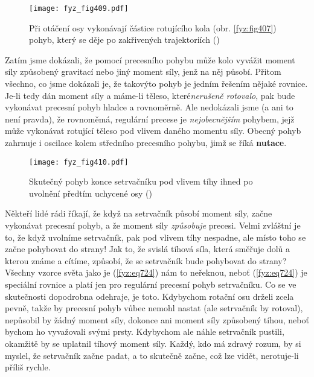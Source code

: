     \begin{figure}[ht!] %
      \centering
      \texttt{[image: fyz\_fig409.pdf]}
      \caption{Při otáčení osy vykonávají částice rotujícího kola (obr. \ref{fyz:fig407}) pohyb, 
               který se děje po zakřivených trajektoriích 
               (\cite[s.~280]{Feynman01})}
      \label{fyz:fig409}
    \end{figure}

    Zatím jsme dokázali, že pomocí precesního pohybu může kolo vyvážit moment síly způsobený
    gravitací nebo jiný moment síly, jenž na něj působí. Přitom všechno, co jsme dokázali je, že
    takovýto pohyb je jedním řešením nějaké rovnice. Je-li tedy dán moment síly a máme-li těleso,
    které\emph{nerušeně rotovalo}, pak bude vykonávat precesní pohyb hladce a rovnoměrně. Ale
    nedokázali jsme (a ani to není pravda), že rovnoměmá, regulární precese je \emph{nejobecnějším}
    pohybem, jejž může vykonávat rotující těleso pod vlivem daného momentu síly. Obecný pohyb
    zahrnuje i oscilace kolem středního precesního pohybu, jimž se říká \textbf{nutace}.

    \begin{figure}[ht!] %
      \centering
      \texttt{[image: fyz\_fig410.pdf]}
      \caption{Skutečný pohyb konce setrvačníku pod vlivem tíhy ihned po uvolnění předtím uchycené
               osy (\cite[s.~281]{Feynman01})}
      \label{fyz:fig410}
    \end{figure}

    Někteří lidé rádi říkají, že když na setrvačník působí moment síly, začne vykonávat precesní
    pohyb, a že moment síly \emph{způsobuje} precesi. Velmi zvláštní je to, že když uvolníme
    setrvačník, pak pod vlivem tíhy nespadne, ale místo toho se začne pohybovat do strany! Jak to,
    že svislá tíhová síla, která směřuje dolů a kterou známe a cítíme, způsobí, že se setrvačník
    bude pohybovat do strany? Všechny vzorce světa jako je (\ref{fyz:eq724}) nám to neřeknou, neboť
    (\ref{fyz:eq724}) je speciální rovnice a platí jen pro regulární precesní pohyb setrvačníku. Co
    se ve skutečnosti dopodrobna odehraje, je toto. Kdybychom rotační osu drželi zcela pevně, takže
    by precesní pohyb vůbec nemohl nastat (ale setrvačník by rotoval), nepůsobil by žádný moment
    síly, dokonce ani moment síly způsobený tíhou, neboť bychom ho vyvažovali svými prsty. Kdybychom
    ale náhle setrvačník pustili, okamžitě by se uplatnil tíhový moment síly. Každý, kdo má zdravý
    rozum, by si myslel, že setrvačník začne padat, a to skutečně začne, což lze vidět, nerotuje-li
    příliš rychle.

